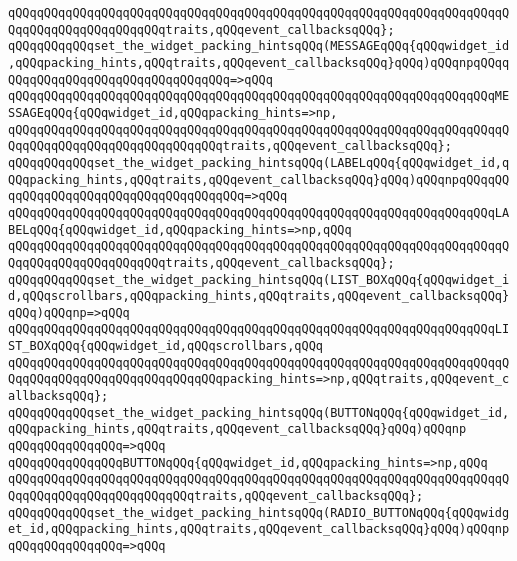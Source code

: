 \verb|qQQqqQQqqQQqqQQqqQQqqQQqqQQqqQQqqQQqqQQqqQQqqQQqqQQqqQQqqQQqqQQqqQQqqQQqqQQqqQQqqQQqqQQqqQQqtraits,qQQqevent_callbacksqQQq};|\newline
\verb|qQQqqQQqqQQqset_the_widget_packing_hintsqQQq(MESSAGEqQQq{qQQqwidget_id,qQQqpacking_hints,qQQqtraits,qQQqevent_callbacksqQQq}qQQq)qQQqnpqQQqqQQqqQQqqQQqqQQqqQQqqQQqqQQqqQQq=>qQQq|\newline
\verb|qQQqqQQqqQQqqQQqqQQqqQQqqQQqqQQqqQQqqQQqqQQqqQQqqQQqqQQqqQQqqQQqqQQqMESSAGEqQQq{qQQqwidget_id,qQQqpacking_hints=>np,|\newline
\verb|qQQqqQQqqQQqqQQqqQQqqQQqqQQqqQQqqQQqqQQqqQQqqQQqqQQqqQQqqQQqqQQqqQQqqQQqqQQqqQQqqQQqqQQqqQQqqQQqqQQqtraits,qQQqevent_callbacksqQQq};|\newline
\verb|qQQqqQQqqQQqset_the_widget_packing_hintsqQQq(LABELqQQq{qQQqwidget_id,qQQqpacking_hints,qQQqtraits,qQQqevent_callbacksqQQq}qQQq)qQQqnpqQQqqQQqqQQqqQQqqQQqqQQqqQQqqQQqqQQqqQQq=>qQQq|\newline
\verb|qQQqqQQqqQQqqQQqqQQqqQQqqQQqqQQqqQQqqQQqqQQqqQQqqQQqqQQqqQQqqQQqqQQqLABELqQQq{qQQqwidget_id,qQQqpacking_hints=>np,qQQq|\newline
\verb|qQQqqQQqqQQqqQQqqQQqqQQqqQQqqQQqqQQqqQQqqQQqqQQqqQQqqQQqqQQqqQQqqQQqqQQqqQQqqQQqqQQqqQQqqQQqtraits,qQQqevent_callbacksqQQq};|\newline
\verb|qQQqqQQqqQQqset_the_widget_packing_hintsqQQq(LIST_BOXqQQq{qQQqwidget_id,qQQqscrollbars,qQQqpacking_hints,qQQqtraits,qQQqevent_callbacksqQQq}qQQq)qQQqnp=>qQQq|\newline
\verb|qQQqqQQqqQQqqQQqqQQqqQQqqQQqqQQqqQQqqQQqqQQqqQQqqQQqqQQqqQQqqQQqqQQqLIST_BOXqQQq{qQQqwidget_id,qQQqscrollbars,qQQq|\newline
\verb|qQQqqQQqqQQqqQQqqQQqqQQqqQQqqQQqqQQqqQQqqQQqqQQqqQQqqQQqqQQqqQQqqQQqqQQqqQQqqQQqqQQqqQQqqQQqqQQqqQQqpacking_hints=>np,qQQqtraits,qQQqevent_callbacksqQQq};|\newline
\newline
\verb|qQQqqQQqqQQqset_the_widget_packing_hintsqQQq(BUTTONqQQq{qQQqwidget_id,qQQqpacking_hints,qQQqtraits,qQQqevent_callbacksqQQq}qQQq)qQQqnp|\newline
\verb|qQQqqQQqqQQqqQQq=>qQQq|\newline
\verb|qQQqqQQqqQQqqQQqBUTTONqQQq{qQQqwidget_id,qQQqpacking_hints=>np,qQQq|\newline
\verb|qQQqqQQqqQQqqQQqqQQqqQQqqQQqqQQqqQQqqQQqqQQqqQQqqQQqqQQqqQQqqQQqqQQqqQQqqQQqqQQqqQQqqQQqqQQqqQQqtraits,qQQqevent_callbacksqQQq};|\newline
\verb|qQQqqQQqqQQqset_the_widget_packing_hintsqQQq(RADIO_BUTTONqQQq{qQQqwidget_id,qQQqpacking_hints,qQQqtraits,qQQqevent_callbacksqQQq}qQQq)qQQqnpqQQqqQQqqQQqqQQq=>qQQq|\newline
